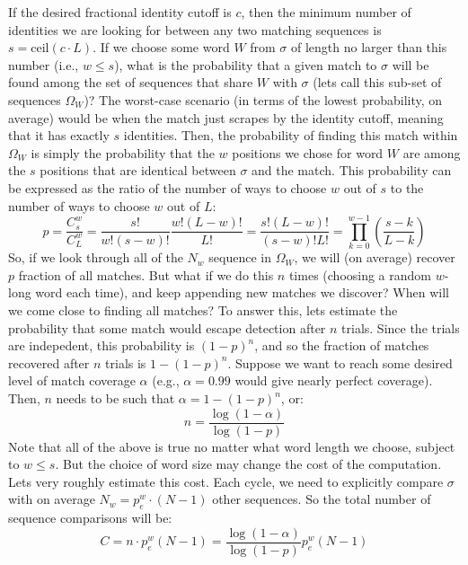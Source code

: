 \documentclass[12pt]{article}
\begin{document}
If the desired fractional identity cutoff is $c$, then the minimum number of identities we are looking for between any two matching sequences is $s = \mathrm{ceil}(c \cdot L)$. If we choose some word $W$ from $\sigma$ of length no larger than this number (i.e., $w \leq s$), what is the probability that a given match to $\sigma$ will be found among the set of sequences that share $W$ with $\sigma$ (lets call this sub-set of sequences $\Omega_W$)? The worst-case scenario (in terms of the lowest probability, on average) would be when the match just scrapes by the identity cutoff, meaning that it has exactly $s$ identities. Then, the probability of finding this match within $\Omega_W$ is simply the probability that the $w$ positions we chose for word $W$ are among the $s$ positions that are identical between $\sigma$ and the match. This probability can be expressed as the ratio of the number of ways to choose $w$ out of $s$ to the number of ways to choose $w$ out of $L$:
\begin{equation}
p = \frac{C^w_s}{C^w_L} = \frac{s!}{w!(s-w)!}\frac{w!(L-w)!}{L!} = \frac{s! (L-w)!}{(s-w)! L!} = \prod_{k=0}^{w-1} \left(\frac{s - k}{L - k}\right)
\end{equation}
So, if we look through all of the $N_w$ sequence in $\Omega_W$, we will  (on average) recover $p$ fraction of all matches. But what if we do this $n$ times (choosing a random $w$-long word each time), and keep appending new matches we discover? When will we come close to finding all matches? To answer this, lets estimate the probability that some match would escape detection after $n$ trials. Since the trials are indepedent, this probability is $(1-p)^n$, and so the fraction of matches recovered after $n$ trials is $1 - (1-p)^n$. Suppose we want to reach some desired level of match coverage $\alpha$ (e.g., $\alpha=0.99$ would give nearly perfect coverage). Then, $n$ needs to be such that $\alpha = 1 - (1-p)^n$, or:
\begin{equation}
n = \frac{\log{(1 - \alpha)}}{\log{(1 - p)}}
\end{equation}
Note that all of the above is true no matter what word length we choose, subject to $w \leq s$. But the choice of word size may change the cost of the computation. Lets very roughly estimate this cost. Each cycle, we need to explicitly compare $\sigma$ with on average $N_w = p_e^w \cdot (N-1)$ other sequences. So the total number of sequence comparisons will be:
\begin{equation}
C = n \cdot p_e^w (N-1) = \frac{\log{(1 - \alpha)}}{\log{(1 - p)}} p_e^w (N-1)
\end{equation}
\end{document}
